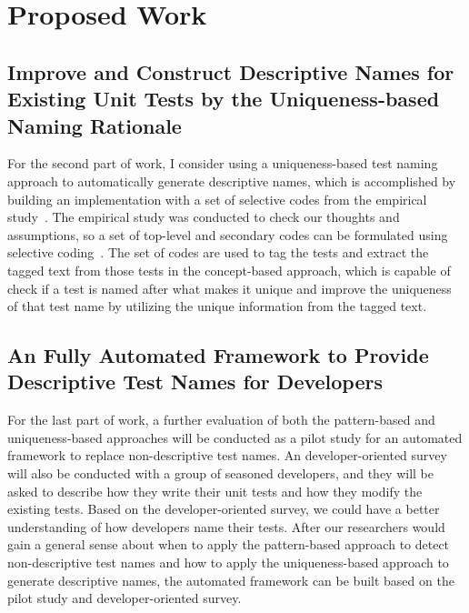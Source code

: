 \section{Proposed Work}
 

\subsection{Improve and Construct Descriptive Names for Existing Unit Tests by the Uniqueness-based Naming Rationale}
\label{sec:unique-test-name}

For the second part of work, I consider using a uniqueness-based test naming approach to automatically generate descriptive names, which is accomplished by building an implementation with a set of selective codes from the empirical study~\cite{emp-study}.
%
The empirical study was conducted to check our thoughts and assumptions, so a set of top-level and secondary codes can be formulated using selective coding~\cite{glaser1967discovery,strauss1998basics}.
%
The set of codes are used to tag the tests and extract the tagged text from those tests in the concept-based approach, which is capable of check if a test is named after what makes it unique and improve the uniqueness of that test name by utilizing the unique information from the tagged text.

\subsection{An Fully Automated Framework to Provide Descriptive Test Names for Developers}

For the last part of work, a further evaluation of both the pattern-based and uniqueness-based approaches will be conducted as a pilot study for an automated framework to replace non-descriptive test names.
%
An developer-oriented survey will also be conducted with a group of seasoned developers, and they will be asked to describe how they write their unit tests and how they modify the existing tests.
%
Based on the developer-oriented survey, we could have a better understanding of how developers name their tests.
%
After our researchers would gain a general sense about when to apply the pattern-based approach to detect non-descriptive test names and how to apply the uniqueness-based approach to generate descriptive names, the automated framework can be built based on the pilot study and developer-oriented survey.



